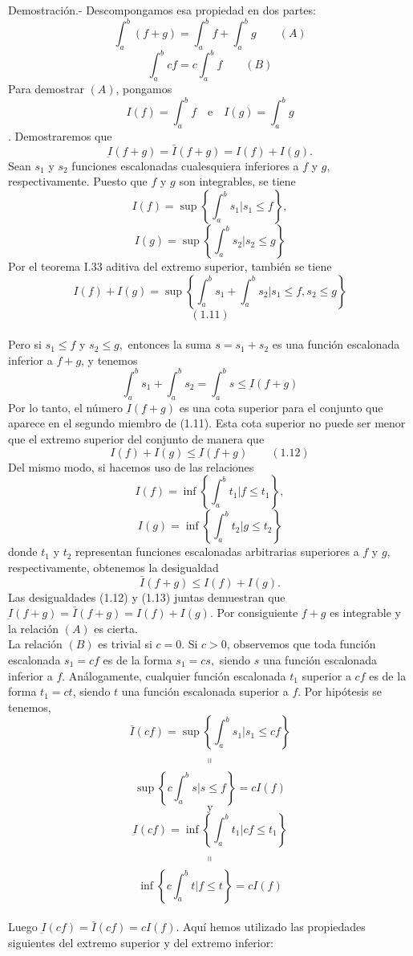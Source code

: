 \begin{multicols}{2}
\begin{teo}
    Demostración.-\; Descompongamos esa propiedad en dos partes:
    $$\int_a^b (f+g) = \int_a^b f + \int_a^b g \qquad (A)$$
    $$\int_a^b cf = c \int_a^b f \qquad (B)$$
    Para demostrar $(A)$, pongamos $$I(f) = \int_a^b f \quad\mbox{e}\quad I(g) = \int_a^b g$$. Demostraremos que $$\underbar{I}(f+g) = \bar{I}(f+g) = I(f) + I(g).$$
    Sean $s_1$ y $s_2$ funciones escalonadas cualesquiera inferiores a $f$ y $g$, respectivamente. Puesto que $f$ y $g$ son integrables, se tiene 
    $$I(f) = \sup\left\{ \int_a^b s_1 | s_1 \leq f \right\},$$ $$I(g) =\sup\left\{ \int_a^b s_2 | s_2 \leq g\right\}$$
    Por el teorema I.33 aditiva del extremo superior, también se tiene $$I(f) + I(g) = \sup\left\{\int_a^b s_1 + \int_a^b s_2 | s_1 \leq f, s_2\leq g\right\}$$ $$(1.11)$$\\
    Pero si $s_1\leq f$ y $s_2 \leq g,$ entonces la suma $s=s_1+s_2$ es una función escalonada inferior a $f+g$, y tenemos 
    $$\int_a^b s_1 + \int_a^b s_2 = \int_a^b s \leq \underbar{I}(f+g)$$
    Por lo tanto, el número $\underbar{I}(f+g)$ es una cota superior para el conjunto que aparece en el segundo miembro de (1.11). Esta cota superior no puede ser menor que el extremo superior del conjunto de manera que $$I(f) + I(g) \leq \underbar{I}(f+g) \qquad (1.12)$$ 
    Del mismo modo, si hacemos uso de las relaciones 
    $$I(f) = \inf\left\{\int_a^b t_1 | f\leq t_1\right\},$$ $$I(g)= \inf\left\{\int_a^b t_2 | g\leq t_2\right\}$$
    donde $t_1$ y $t_2$ representan funciones escalonadas arbitrarias superiores a $f$ y $g$, respectivamente, obtenemos la desigualdad
    $$\bar{I}(f+g) \leq I(f) + I(g).$$
    Las desigualdades (1.12) y (1.13) juntas demuestran que $\underbar{I}(f+g) = \bar{I} (f+g) = I(f) + I(g)$. Por consiguiente $f+g$ es integrable y la relación $(A)$ es cierta.\\
    La relación $(B)$ es trivial si $c=0$. Si $c>0$, observemos que toda función escalonada $s_1=cf$ es de la forma $s_1=cs,$ siendo $s$ una función escalonada inferior a $f$. Análogamente, cualquier función escalonada $t_1$ superior a $cf$ es de la forma $t_1=ct$, siendo $t$ una función escalonada superior a $f$. Por hipótesis se tenemos, 
    $$\bar{I}(cf) = \sup\left\{ \int_a^b s_1 | s_1 \leq cf\right\} $$$$\shortparallel$$$$ \sup\left\{c\int_a^b s | s \leq f\right\} = cI(f)$$
    $$\mbox{y}$$ 
    $$\underbar{I}(cf) = \inf\left\{\int_a^b t_1 | cf \leq t_1\right\} $$$$\shortparallel$$$$ \inf\left\{c\int_a^b t | f \leq t\right\} = cI(f)$$\\
    Luego $\underbar{I}(cf)=\bar{I}(cf)=cI(f).$ Aquí hemos utilizado las propiedades siguientes del extremo superior y del extremo inferior:

\end{teo}
\end{multicols}
